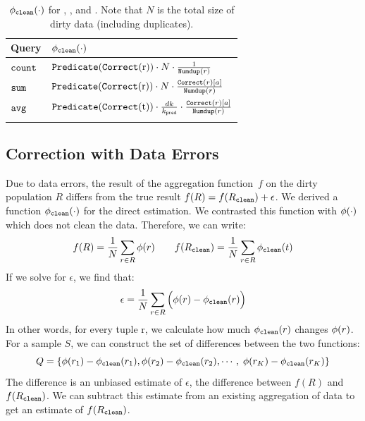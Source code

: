 \begin{table}[tup]\vspace{-1em}

\small
\caption{$\phi_{\texttt{clean} } (\cdot)$ for \countfunc, \sumfunc, and \avgfunc. Note that $N$ is the total size of dirty data (including duplicates).}
\centering 
\begin{tabular}{l l}
\hline\hline
Query & $\phi_{\texttt{clean} } (\cdot)$\\
\hline  %
\vspace{.5em}
$\texttt{count}$ & $
		\Predicatec{r}\cdot N\cdot\frac{1}{\Dedup{r}{R}}
$ \\\vspace{.5em} %
$\texttt{sum} $ & $
		\Predicatec{r}\cdot N\cdot\frac{\Correct{r}[a]}{\Dedup{r}{R}}
$ \\\vspace{.5em}
$\texttt{avg} $ & $
		\Predicatec{t}\cdot \frac{dk}{k_{\pred}}\cdot\frac{\Correct{r}[a]}{\Dedup{r}{R}}
$ \\ [1ex] %
\hline %
\label{tbl:transform-new}
\end{tabular}\vspace{-2em}
\end{table}

\subsection{Correction with Data Errors}
Due to data errors, the result of the aggregation function~$f$ on the dirty population $R$ differs from the true result $f(R) = f(R_{\texttt{clean} }) + \epsilon$.
We derived a function $\phi_{\texttt{clean} } (\cdot)$ for the direct estimation.
We contrasted this function with $\phi  ( \cdot )$ which does not clean the data.
Therefore, we can write:
\[
f(R) = \frac{1}{N}\sum_{r\in R}\phi (r)\hspace{2em}
f(R_{\texttt{clean} }) = \frac{1}{N}\sum_{r\in R}\phi_{\texttt{clean} } (t)
\]
If we solve for $\epsilon$, we find that:
\[
\epsilon = \frac{1}{N}\sum_{r\in R}\Big(\phi (r)-\phi_{\texttt{clean} } (r)\Big)
\]
In other words, for every tuple r, we calculate how much $\phi_{\texttt{clean} } (r)$ changes $\phi (r)$.
For a sample $S$, we can construct the set of differences between the two functions:
\[\scriptsize
Q=\{\phi (r_1)-\phi_{\texttt{clean} } (r_1),\phi (r_2)-\phi_{\texttt{clean} } (r_2), \cdots ,\ \phi (r_K)-\phi_{\texttt{clean} } (r_K)\}\]
The \mean difference is an unbiased estimate of $\epsilon$, the difference between $f(R)$ and $f(R_{\texttt{clean} })$.
We can subtract this estimate from an existing aggregation of data to get an estimate of $f(R_{\texttt{clean} })$.


